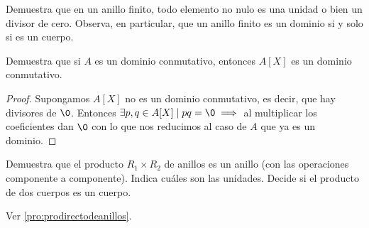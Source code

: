 \begin{ex}[H5.4]
	\label{ex:h5.4}
	Demuestra que en un anillo finito, todo elemento no nulo es una unidad o bien un divisor de cero. Observa, en particular, que un anillo finito es un dominio si y solo si es un cuerpo.
\end{ex}

\begin{ex}[H5.6]
	Demuestra que si $A$ es un dominio conmutativo, entonces $A[X]$ es un dominio conmutativo.
\end{ex}

\begin{proof}
	Supongamos $A[X]$ no es un dominio conmutativo, es decir, que hay divisores de $\0$. Entonces $\exists p, q \in A[X] \mid pq = \0 \implies$ al multiplicar los coeficientes dan $\0$ con lo que nos reducimos al caso de $A$ que ya es un dominio.
\end{proof}

\begin{ex}[H5.7]
	Demuestra que el producto $R_1 \times R_2$ de anillos es un anillo (con las operaciones componente a componente). Indica cuáles son las unidades. Decide si el producto de dos cuerpos es un cuerpo.
\end{ex}

Ver \autoref{pro:prodirectodeanillos}.

